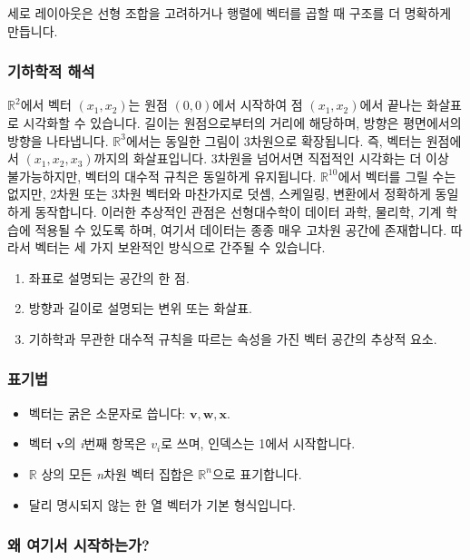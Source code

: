 \documentclass[
  12pt,
  a4paper,
]{article}
\begin{document}
세로 레이아웃은 선형 조합을 고려하거나 행렬에 벡터를 곱할 때 구조를 더 명확하게 만듭니다.

\subsubsection{기하학적 해석}\label{geometric-interpretation}

\(\mathbb{R}^2\)에서 벡터 \((x_1, x_2)\)는 원점 \((0,0)\)에서 시작하여 점 \((x_1, x_2)\)에서 끝나는 화살표로 시각화할 수 있습니다. 길이는 원점으로부터의 거리에 해당하며, 방향은 평면에서의 방향을 나타냅니다. \(\mathbb{R}^3\)에서는 동일한 그림이 3차원으로 확장됩니다. 즉, 벡터는 원점에서 \((x_1, x_2, x_3)\)까지의 화살표입니다. 3차원을 넘어서면 직접적인 시각화는 더 이상 불가능하지만, 벡터의 대수적 규칙은 동일하게 유지됩니다. \(\mathbb{R}^{10}\)에서 벡터를 그릴 수는 없지만, 2차원 또는 3차원 벡터와 마찬가지로 덧셈, 스케일링, 변환에서 정확하게 동일하게 동작합니다. 이러한 추상적인 관점은 선형대수학이 데이터 과학, 물리학, 기계 학습에 적용될 수 있도록 하며, 여기서 데이터는 종종 매우 고차원 공간에 존재합니다. 따라서 벡터는 세 가지 보완적인 방식으로 간주될 수 있습니다.

\begin{enumerate}
\def\labelenumi{\arabic{enumi}.}
\item
  좌표로 설명되는 공간의 한 점.
\item
  방향과 길이로 설명되는 변위 또는 화살표.
\item
  기하학과 무관한 대수적 규칙을 따르는 속성을 가진 벡터 공간의 추상적 요소.
\end{enumerate}

\subsubsection{표기법}\label{notation}

\begin{itemize}
\item
  벡터는 굵은 소문자로 씁니다:
  \(\mathbf{v}, \mathbf{w}, \mathbf{x}\).
\item
  벡터 \(\mathbf{v}\)의 \emph{i}번째 항목은 \(v_i\)로 쓰며, 인덱스는 1에서 시작합니다.
\item
  \(\mathbb{R}\) 상의 모든 \emph{n}차원 벡터 집합은 \(\mathbb{R}^n\)으로 표기합니다.
\item
  달리 명시되지 않는 한 열 벡터가 기본 형식입니다.
\end{itemize}

\subsubsection{왜 여기서 시작하는가?}\label{why-begin-here}
\end{document}

